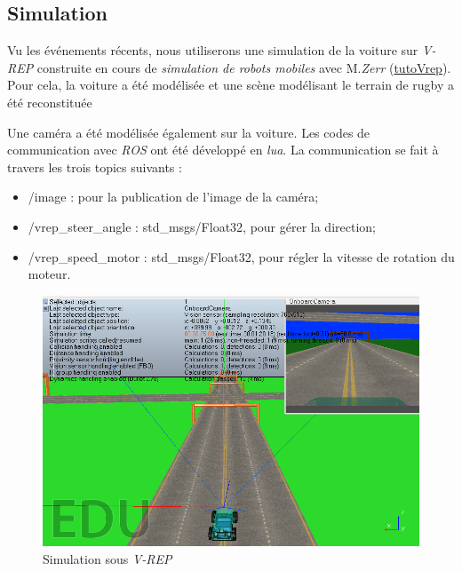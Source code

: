 \documentclass[12pt, openany]{report}
\begin{document}
\subsection{Simulation}
Vu les événements récents, nous utiliserons une simulation de la voiture sur \emph{V-REP} construite en cours de \emph{simulation de robots mobiles} avec M.\emph{Zerr} (\hyperlink{https://www.ensta-bretagne.fr/zerr/dokuwiki/doku.php?id=vrep:main#v1}{tutoVrep}).\\

Pour cela, la voiture a été modélisée et une scène modélisant le terrain de rugby a été reconstituée

Une caméra a été modélisée également sur la voiture. Les codes de communication avec \emph{ROS} ont été développé en \emph{lua}. La communication se fait à travers les trois topics suivants : 
\begin{itemize}
    \item /image : pour la publication de l'image de la caméra;
    \item /vrep\_steer\_angle : std\_msgs/Float32, pour gérer la direction;
    \item /vrep\_speed\_motor : std\_msgs/Float32, pour régler la vitesse de rotation du moteur. 
\end{itemize}

      \begin{figure}[!h]
      \begin{center}
        \hfill \includegraphics[scale=0.5]{imgs/vrep.png} \hspace*{\fill}
        \caption{Simulation sous \emph{V-REP}}
      \end{center}
      \end{figure}
\end{document}
